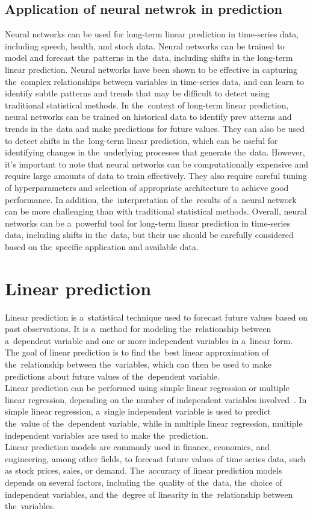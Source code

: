 \subsection{Application of neural netwrok in prediction} \label{subsec:nnprediction}
Neural networks can be used for long-term linear prediction in time-series data, including speech, health, and
stock data. Neural networks can be trained to model and forecast the~patterns in the~data, including shifts in
the long-term linear prediction. Neural networks have been shown to be effective in capturing the~complex relationships
between variables in time-series data, and can learn to identify subtle patterns and trends that may be difficult
to detect using traditional statistical methods. In the~context of long-term linear prediction, neural networks can be
trained on historical data to identify prev    atterns and trends in the~data and make predictions for future values.
They can also be used to detect shifts in the~long-term linear prediction, which can be useful for identifying
changes in the~underlying processes that generate the~data. However, it's important to note that neural networks
can be computationally expensive and require large amounts of data to train effectively. They also require careful
tuning of hyperparameters and selection of appropriate architecture to achieve good performance.
In addition, the~interpretation of the~results of a~neural network can be more challenging than with traditional
statistical methods. Overall, neural networks can be a~powerful tool for long-term linear prediction in time-series
data, including shifts in the~data, but their use should be carefully considered based on the~specific
application and available data.


\section{Linear prediction} \label{sec:lp}
Linear prediction is a~statistical technique used to forecast future values based on past observations. It is a~method
for modeling the~relationship between a~dependent variable and one or more independent variables in a~linear form.
The goal of linear prediction is to find the~best linear approximation of the~relationship between the~variables,
which can then be used to make predictions about future values of the~dependent variable.
\\
Linear prediction can be performed using simple linear regression or multiple linear regression, depending on the
number of independent variables involved~\cite{Parks}. In simple linear regression, a~single independent variable is
used to predict the~value of the~dependent variable, while in multiple linear regression, multiple independent
variables are used to make the~prediction.
\\
Linear prediction models are commonly used in finance, economics, and engineering, among other fields, to forecast
future values of time series data, such as stock prices, sales, or demand. The~accuracy of linear prediction models
depends on several factors, including the~quality of the~data, the~choice of independent variables, and the~degree of
linearity in the~relationship between the~variables.

